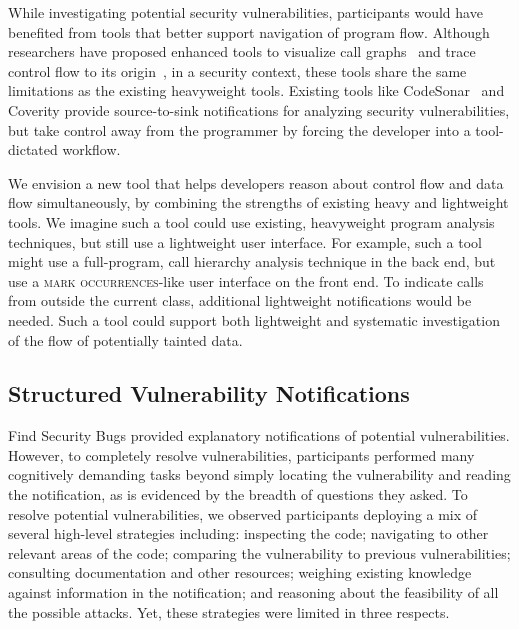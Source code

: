 \documentclass{acm_proc_article-sp}
\begin{document}
While investigating potential security vulnerabilities, 
participants would have benefited from tools that better support navigation of program flow.
Although researchers have proposed enhanced tools to visualize call graphs~\cite{latoza2011visualizing} and trace control flow to its origin~\cite{barnett2014getMeHere},
in a security context, these tools share the same limitations as the existing heavyweight tools.
Existing tools like CodeSonar~\cite{keylist} and Coverity provide source-to-sink notifications for analyzing security
vulnerabilities, but take control away from the programmer by forcing the developer into a tool-dictated
workflow.


We envision a new tool that helps developers reason about control flow and data flow simultaneously,
by combining the strengths of existing heavy and lightweight tools.
We imagine such a tool could use existing, heavyweight program analysis techniques, but still
use a lightweight user interface.
For example, such a tool might use a full-program, call hierarchy analysis technique in the back end,
but use a \textsc{mark occurrences}-like user interface on the front end.
To indicate calls from outside the current class, additional lightweight notifications would be needed.
Such a tool could support both lightweight and systematic investigation of the flow of 
potentially tainted data.




\subsection{Structured Vulnerability Notifications}
\label{structuredNotifications}
Find Security Bugs provided explanatory notifications of potential vulnerabilities.
However, to completely resolve vulnerabilities,
participants performed many cognitively demanding tasks beyond simply locating the vulnerability and reading the notification, 
as is evidenced by the breadth of questions they asked. 
To resolve potential vulnerabilities, we observed participants deploying a mix of several high-level strategies including: 
inspecting the code;
navigating to other relevant areas of the code; 
comparing the vulnerability to previous vulnerabilities; 
consulting documentation and other resources; 
weighing existing knowledge against information in the notification; 
and reasoning about the feasibility of all the possible attacks. 
Yet, these strategies were limited in three respects.
\end{document}
